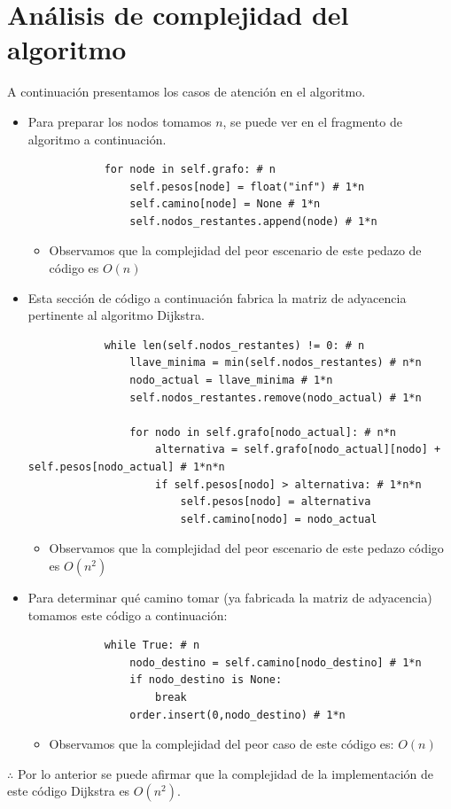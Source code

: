 \documentclass{article}
\begin{document}
\section{Análisis de complejidad del algoritmo}
A continuación presentamos los casos de atención en el algoritmo.
\begin{itemize}
    \item Para preparar los nodos tomamos $n$, se puede ver en el fragmento de algoritmo a continuación. 
        \begin{verbatim}
            for node in self.grafo: # n
                self.pesos[node] = float("inf") # 1*n
                self.camino[node] = None # 1*n
                self.nodos_restantes.append(node) # 1*n
        \end{verbatim}
        \begin{itemize}
            \item Observamos que la complejidad del peor escenario de este pedazo de código es $O(n)$ 
        \end{itemize}
    
    \item Esta sección de código a continuación fabrica la matriz de adyacencia pertinente al algoritmo Dijkstra.
        \begin{verbatim}
            while len(self.nodos_restantes) != 0: # n
                llave_minima = min(self.nodos_restantes) # n*n
                nodo_actual = llave_minima # 1*n
                self.nodos_restantes.remove(nodo_actual) # 1*n
                
                for nodo in self.grafo[nodo_actual]: # n*n
                    alternativa = self.grafo[nodo_actual][nodo] + self.pesos[nodo_actual] # 1*n*n
                    if self.pesos[nodo] > alternativa: # 1*n*n
                        self.pesos[nodo] = alternativa 
                        self.camino[nodo] = nodo_actual
        \end{verbatim}
        \begin{itemize}
            \item Observamos que la complejidad del peor escenario de este pedazo código es $O(n^2)$ 
        \end{itemize}
    
    \item Para determinar qué camino tomar (ya fabricada la matriz de adyacencia) tomamos este código a continuación:
        \begin{verbatim}
            while True: # n
                nodo_destino = self.camino[nodo_destino] # 1*n 
                if nodo_destino is None: 
                    break
                order.insert(0,nodo_destino) # 1*n
        \end{verbatim}
        \begin{itemize}
            \item Observamos que la complejidad del peor caso de este código es: $O(n)$ 
        \end{itemize}
\end{itemize}

$\therefore$ Por lo anterior se puede afirmar que la complejidad de la implementación de este código Dijkstra es $O(n^2)$.




\end{document}
